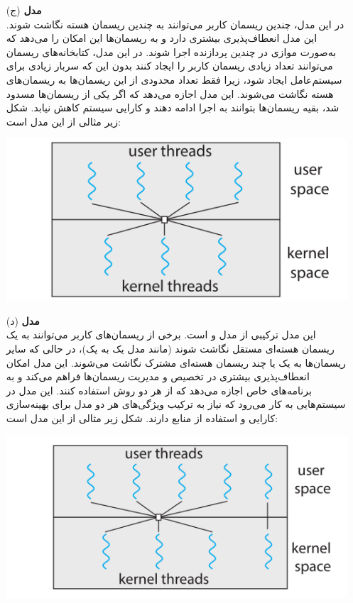 \begin{enumerate}
\begin{qsolve}
\begin{enumerate}
			
			
			\item [(ج)]
			\textbf{مدل }\\
			در این مدل، چندین ریسمان کاربر می‌توانند به چندین ریسمان هسته نگاشت شوند.
			این مدل انعطاف‌پذیری بیشتری دارد و به ریسمان‌ها این امکان را می‌دهد که به‌صورت موازی در چندین پردازنده اجرا شوند.
			در این مدل، کتابخانه‌های ریسمان می‌توانند تعداد زیادی ریسمان کاربر را ایجاد کنند بدون این که سربار زیادی برای سیستم‌عامل ایجاد شود، زیرا فقط تعداد محدودی از این ریسمان‌ها به ریسمان‌های هسته نگاشت می‌شوند.
			این مدل اجازه می‌دهد که اگر یکی از ریسمان‌ها مسدود شد، بقیه ریسمان‌ها بتوانند به اجرا ادامه دهند و کارایی سیستم کاهش نیابد. شکل زیر مثالی از این مدل است:
			
			\begin{center}
				\includegraphics*[width=0.6\linewidth]{pics/img3.png}
			\end{center}
		\end{enumerate}
	\end{qsolve}
	
	
	\begin{qsolve}
		\begin{enumerate}
			\item [(د)]
			\textbf{مدل }\\
			این مدل ترکیبی از مدل  و  است.
			برخی از ریسمان‌های کاربر می‌توانند به یک ریسمان هسته‌ای مستقل نگاشت شوند (مانند مدل یک به یک)، در حالی که سایر ریسمان‌ها به یک یا چند ریسمان هسته‌ای مشترک نگاشت می‌شوند.
			این مدل امکان انعطاف‌پذیری بیشتری در تخصیص و مدیریت ریسمان‌ها فراهم می‌کند و به برنامه‌های خاص اجازه می‌دهد که از هر دو روش استفاده کنند.
			این مدل در سیستم‌هایی به کار می‌رود که نیاز به ترکیب ویژگی‌های هر دو مدل برای بهینه‌سازی کارایی و استفاده از منابع دارند. شکل زیر مثالی از این مدل است:
			
			\begin{center}
				\includegraphics*[width=0.6\linewidth]{pics/img4.png}
			\end{center}
		\end{enumerate}
	\end{qsolve}
		

\end{enumerate}
